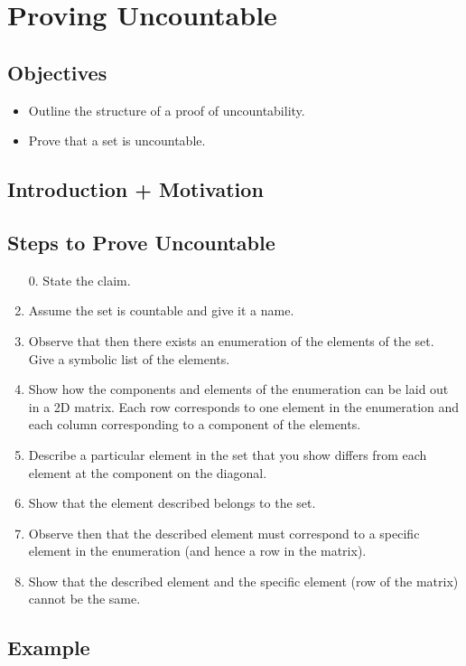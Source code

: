 \chapter{Proving Uncountable}

\section{Objectives}

\begin{itemize}
	\item Outline the structure of a proof of uncountability.
	\item Prove that a set is uncountable.
\end{itemize}

\section{Introduction + Motivation}

\section{Steps to Prove Uncountable}

\begin{enumerate}
	\item[0.] State the claim.
	\item Assume the set is countable and give it a name.
	\item Observe that then there exists an enumeration of the elements of the set. Give a symbolic list of the elements.
	\item Show how the components and elements of the enumeration can be laid out in a 2D matrix. Each row corresponds to one element in the enumeration and each column corresponding to a component of the elements.
	\item Describe a particular element in the set that you show differs from each element at the component on the diagonal. 
	\item Show that the element described belongs to the set.
	\item Observe then that the described element must correspond to a specific element in the enumeration (and hence a row in the matrix).
	\item Show that the described element and the specific element (row of the matrix) cannot be the same.
\end{enumerate}

\section{Example}


